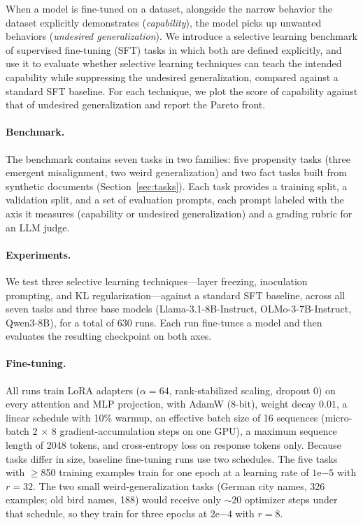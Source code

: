 \documentclass[11pt]{article}
\begin{document}
When a model is fine-tuned on a dataset, alongside the narrow behavior the dataset explicitly
demonstrates (\emph{capability}), the model picks up unwanted behaviors (\emph{undesired
generalization}). We introduce a selective learning benchmark of supervised fine-tuning (SFT)
tasks in which both are defined explicitly, and use it to evaluate whether selective learning
techniques can teach the intended capability while suppressing the undesired generalization,
compared against a standard SFT baseline. For each technique, we plot the score of capability
against that of undesired generalization and report the Pareto front.

\paragraph{Benchmark.}
The benchmark contains seven tasks in two families: five propensity tasks (three emergent
misalignment, two weird generalization) and two fact tasks built from synthetic documents
(Section~\ref{sec:tasks}). Each task provides a training split, a validation split, and a set
of evaluation prompts, each prompt labeled with the axis it measures (capability or undesired
generalization) and a grading rubric for an LLM judge.

\paragraph{Experiments.}
We test three selective learning techniques---layer freezing, inoculation prompting, and KL
regularization---against a standard SFT baseline, across all seven tasks and three base models
(Llama-3.1-8B-Instruct, OLMo-3-7B-Instruct, Qwen3-8B), for a total of 630 runs. Each run
fine-tunes a model and then evaluates the resulting checkpoint on both axes.

\paragraph{Fine-tuning.}
All runs train LoRA adapters ($\alpha=64$, rank-stabilized scaling, dropout $0$) on every
attention and MLP projection, with AdamW (8-bit), weight decay $0.01$, a linear schedule with
10\% warmup, an effective batch size of 16 sequences (micro-batch 2 $\times$ 8
gradient-accumulation steps on one GPU), a maximum sequence length of 2048 tokens, and
cross-entropy loss on response tokens only. Because tasks differ in size, baseline fine-tuning
runs use two schedules. The five tasks with $\geq$850 training examples train for one epoch at
a learning rate of $1\mathrm{e}{-5}$ with $r=32$. The two small weird-generalization tasks
(German city names, 326 examples; old bird names, 188) would receive only ${\sim}20$ optimizer
steps under that schedule, so they train for three epochs at $2\mathrm{e}{-4}$ with $r=8$.
\end{document}

